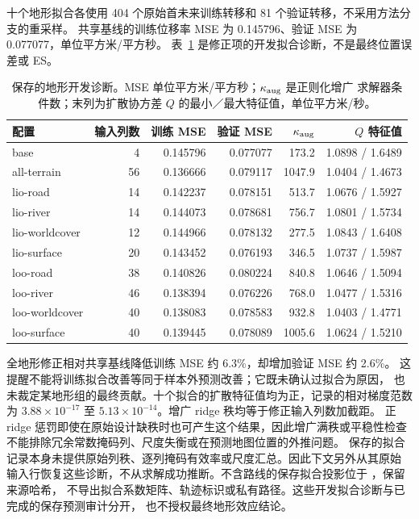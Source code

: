 \documentclass[UTF8,11pt]{ctexart}
\begin{document}
十个地形拟合各使用 404 个原始首未来训练转移和 81 个验证转移，不采用方法分支的重采样。
共享基线的训练位移率 MSE 为 0.145796、验证 MSE 为 0.077077，单位平方米/平方秒。
表~\ref{tab:terrain-fit-diagnostics} 是修正项的开发拟合诊断，不是最终位置误差或 ES。

\begin{table}[htbp]
\centering\footnotesize
\caption{保存的地形开发诊断。MSE 单位平方米/平方秒；\(\kappa_{\rm aug}\) 是正则化增广
求解器条件数；末列为扩散协方差 \(Q\) 的最小／最大特征值，单位平方米/秒。}
\label{tab:terrain-fit-diagnostics}
\begin{tabular}{lrrrrr}
\toprule
配置 & 输入列数 & 训练 MSE & 验证 MSE & \(\kappa_{\rm aug}\) & \(Q\) 特征值\\
\midrule
base & 4 & 0.145796 & 0.077077 & 173.2 & 1.0898 / 1.6489\\
all-terrain & 56 & 0.136666 & 0.079117 & 1047.9 & 1.0404 / 1.4673\\
lio-road & 14 & 0.142237 & 0.078151 & 513.7 & 1.0676 / 1.5927\\
lio-river & 14 & 0.144073 & 0.078681 & 756.7 & 1.0801 / 1.5734\\
lio-worldcover & 12 & 0.144966 & 0.078132 & 277.5 & 1.0843 / 1.6408\\
lio-surface & 20 & 0.143452 & 0.076193 & 346.5 & 1.0737 / 1.5987\\
loo-road & 38 & 0.140826 & 0.080224 & 840.8 & 1.0646 / 1.5094\\
loo-river & 46 & 0.138394 & 0.076226 & 768.0 & 1.0477 / 1.5316\\
loo-worldcover & 40 & 0.138083 & 0.078583 & 932.8 & 1.0403 / 1.4771\\
loo-surface & 40 & 0.139445 & 0.078089 & 1005.6 & 1.0624 / 1.5210\\
\bottomrule
\end{tabular}
\end{table}

全地形修正相对共享基线降低训练 MSE 约 6.3\%，却增加验证 MSE 约 2.6\%。
这提醒不能将训练拟合改善等同于样本外预测改善；它既未确认过拟合为原因，
也未裁定某地形组的最终贡献。十个拟合的扩散特征值均为正，记录的相对梯度范数为
\(3.88\times10^{-17}\) 至 \(5.13\times10^{-14}\)。增广 ridge 秩均等于修正输入列数加截距。
正 ridge 惩罚即使在原始设计缺秩时也可产生这个结果，因此增广满秩或平稳性检查
不能排除冗余常数掩码列、尺度失衡或在预测地图位置的外推问题。
保存的拟合记录本身未提供原始列秩、逐列掩码有效率或尺度汇总。因此下文另外从其原始
输入行恢复这些诊断，不从求解成功推断。不含路线的保存拟合投影位于
，保留来源哈希，
不导出拟合系数矩阵、轨迹标识或私有路径。这些开发拟合诊断与已完成的保存预测审计分开，
也不授权最终地形效应结论。
\end{document}
